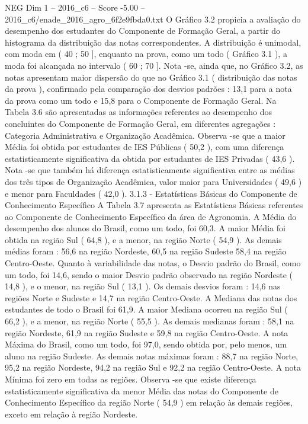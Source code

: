 \begin{textsample}{NEG Dim 1 – 2016\_c6 – Score -5.00 – 2016\_c6/enade\_2016\_agro\_6f2e9fbda0.txt}
O Gráfico 3.2 propicia a avaliação do desempenho dos estudantes do Componente de Formação Geral, a partir do histograma da distribuição das notas correspondentes.
A distribuição é unimodal, com moda em ( 40 ; 50 ], enquanto na prova, como um todo ( Gráfico 3.1 ), a moda foi alcançada no intervalo ( 60 ; 70 ].
Nota -se, ainda que, no Gráfico 3.2, as notas apresentam maior dispersão do que no Gráfico 3.1 ( distribuição das notas da prova ), confirmado pela comparação dos desvios padrões : 13,1 para a nota da prova como um todo e 15,8 para o Componente de Formação Geral.
Na Tabela 3.6 são apresentadas as informações referentes ao desempenho dos concluintes do Componente de Formação Geral, em diferentes agregações : Categoria Administrativa e Organização Acadêmica.
Observa -se que a maior Média foi obtida por estudantes de IES Públicas ( 50,2 ), com uma diferença estatisticamente significativa da obtida por estudantes de IES Privadas ( 43,6 ).
Nota -se que também há diferença estatisticamente significativa entre as médias dos três tipos de Organização Acadêmica, valor maior para Universidades ( 49,6 ) e menor para Faculdades ( 42,0 ). 3.1.3 - Estatísticas Básicas do Componente de Conhecimento Específico A Tabela 3.7 apresenta as Estatísticas Básicas referentes ao Componente de Conhecimento Específico da área de Agronomia.
A Média do desempenho dos alunos do Brasil, como um todo, foi 60,3.
A maior Média foi obtida na região Sul ( 64,8 ), e a menor, na região Norte ( 54,9 ).
As demais médias foram : 56,6 na região Nordeste, 60,5 na região Sudeste 58,4 na região Centro-Oeste.
Quanto à variabilidade das notas, o Desvio padrão do Brasil, como um todo, foi 14,6, sendo o maior Desvio padrão observado na região Nordeste ( 14,8 ), e o menor, na região Sul ( 13,1 ).
Os demais desvios foram : 14,6 nas regiões Norte e Sudeste e 14,7 na região Centro-Oeste.
A Mediana das notas dos estudantes de todo o Brasil foi 61,9.
A maior Mediana ocorreu na região Sul ( 66,2 ), e a menor, na região Norte ( 55,5 ).
As demais medianas foram : 58,1 na região Nordeste, 61,9 na região Sudeste e 59,8 na região Centro-Oeste.
A nota Máxima do Brasil, como um todo, foi 97,0, sendo obtida por, pelo menos, um aluno na região Sudeste.
As demais notas máximas foram : 88,7 na região Norte, 95,2 na região Nordeste, 94,2 na região Sul e 92,2 na região Centro-Oeste.
A nota Mínima foi zero em todas as regiões.
Observa -se que existe diferença estatisticamente significativa da menor Média das notas do Componente de Conhecimento Específico da região Norte ( 54,9 ) em relação às demais regiões, exceto em relação à região Nordeste.

\end{textsample}
